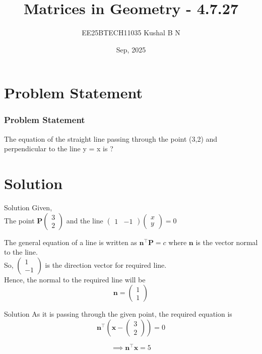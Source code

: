 \documentclass{beamer}
\title{Matrices in Geometry - 4.7.27}
\author{EE25BTECH11035  Kushal B N}
\date{Sep, 2025}
\let\vec\mathbf
\providecommand{\brak}[1]{\ensuremath{\left(#1\right)}}
\theoremstyle{remark}
\newcommand{\myvec}[1]{\ensuremath{\begin{pmatrix}#1\end{pmatrix}}}
\begin{document}
\maketitle

\section{Problem Statement}
\begin{frame}
\frametitle{Problem Statement}
The equation of the straight line passing through the point (3,2) and perpendicular to the line y = x is ?
\end{frame}

\section{Solution}
\begin{frame}{Solution}
Given,\\
The point $\vec{P}\myvec{3\\2}$ and the line $\myvec{1&-1}\myvec{x\\y} = 0$

The general equation of a line is written as $\vec{n}^{\top}\vec{P}=c$ where $\vec{n}$ is the vector normal to the line.\\
So, $\myvec{1\\-1}$ is the direction vector for required line.\\
Hence, the normal to the required line will be 
\begin{equation}
    \vec{n} = \myvec{1\\1}
\end{equation}


\end{frame}


\begin{frame}{Solution}
As it is passing through the given point, the required equation is
\begin{equation}
    \vec{n}^{\top}\brak{\vec{x}-\myvec{3\\2}} = 0
\end{equation}

\begin{equation}
    \implies \vec{n}^{\top}\vec{x} = 5
\end{equation}
\end{frame}
\end{document}
